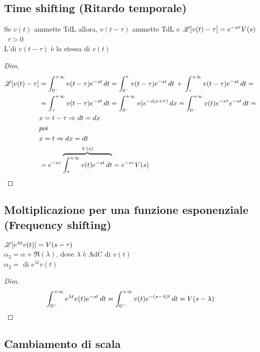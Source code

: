\subsection{Time shifting (Ritardo temporale)}
Se $v(t)$ ammette TdL allora, $v(t - \tau)$ ammette TdL e $\mathscr{L}[v(t) - \tau] = e^{-s\tau}V(s)$\, $\tau>0$\\
L'\AdC di $v(t - \tau)$ è la stessa di $v(t)$
\begin{proof}[Dim]
   \[
      \begin{split}
         \LA[v(t) - \tau] & = \intZeroInfinity v(t - \tau)e^{-st}\,dt = \int_{0^-}^\tau v(t - \tau)e^{-st}\,dt\,+\,\int_\tau^{+\infty}v(t - \tau)e^{-st}\,dt =\\
         & = \int_\tau^{+\infty}v(t - \tau)e^{-st}\,dt = \intZeroInfinity v(e^{-s(x + \tau)}\,dx = \intZeroInfinity v(t)e^{-s\tau}e^{-st}\,dt =\\
         & x = t - \tau \Rightarrow dt = dx \\
         & poi \\ %
         & x = t \Rightarrow dx = dt\\
         & = e^{-s\tau}\overbrace{\int_\tau^{+\infty}v(t)e^{-st}\,dt}^{V(s)} = e^{-s\tau}V(s)
      \end{split}
   \]
\end{proof}
\subsection{Moltiplicazione per una funzione esponenziale (Frequency shifting)}
   $\mathscr{L}[e^{\lambda t}v(t)] = V(s - \tau)$\\
   $\alpha_2 = \alpha + \Re(\lambda)$, dove $\lambda$ è AdC di $v(t)$\\
   $\alpha_2 = $ \AdC di $e^{\lambda t}v(t)$
\begin{proof}[Dim]
   \[
      \int_{0^-}^{+\infty} e^{\lambda t}v(t)e^{-st}\,dt = \int_{0^-}^{+\infty} v(t)e^{-(s - \lambda)t}\,dt = V(s - \lambda)
   \]
\end{proof}
\subsection{Cambiamento di scala}

